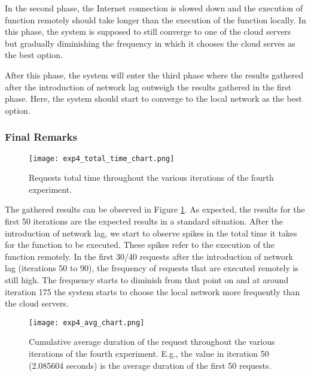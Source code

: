 In the second phase, the Internet connection is slowed down and the execution of
function remotely should take longer than the execution of the function locally.
In this phase, the system is supposed to still converge to one of the cloud
servers but gradually diminishing the frequency in which it chooses the cloud
serves as the best option.

After this phase, the system will enter the third phase where the results gathered
after the introduction of network lag outweigh the results gathered in the first
phase. Here, the system should start to converge to the local network as the
best option.


\subsubsection{Final Remarks}

\begin{figure}[h]
  \begin{center}
    \texttt{[image: exp4\_total\_time\_chart.png]}
    \caption{Requests total time throughout the various iterations of the
    fourth experiment.}
    \label{fig:exp4_total_time_chart}
  \end{center}
\end{figure}


The gathered results can be observed in Figure \ref{fig:exp4_total_time_chart}. As
expected, the results for the first 50 iterations are the expected results in a
standard situation. After the introduction of network lag, we start to observe
spikes in the total time it takes for the function to be executed. These spikes
refer to the execution of the function remotely. In the first 30/40 requests after
the introduction of network lag (iterations 50 to 90), the frequency of requests
that are executed remotely is still high. The frequency starts to diminish
from that point on and at around iteration 175 the system starts to choose the
local network more frequently than the cloud servers.

\begin{figure}[h]
  \begin{center}
    \texttt{[image: exp4\_avg\_chart.png]}
    \caption{Cumulative average duration of the request throughout the various iterations of the fourth experiment. E.g., the value in iteration 50 (2.085604 seconds) is the average duration of the first 50 requests.}
    \label{fig:exp4_avg_chart}
  \end{center}
\end{figure}

